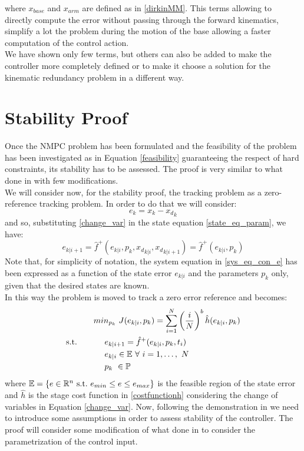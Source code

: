 where $x_{base}$ and $x_{arm}$ are defined as in \ref{dirkinMM}.
This terms allowing to directly compute the error without passing through the forward kinematics, simplify a lot the problem during the motion of the base allowing a faster computation of the control action.\\We have shown only few terms, but others can also be added to make the controller more completely defined or to make it choose a solution for the kinematic redundancy problem in a different way. 

\section{Stability Proof}\label{stabproof}

Once the NMPC problem has been formulated and the feasibility of the problem has been investigated as in Equation \ref{feasibility} guaranteeing the respect of hard  constraints, its stability has to be assessed. The proof is very similar to what done in \cite{alamir2018stability} with few modifications.\\
We will consider now, for the stability proof, the tracking problem as a zero-reference tracking problem. In order to do that we will consider:
\begin{equation}\label{change_var}
    e_k=x_k-{x_d}_k
\end{equation}
and so, substituting \ref{change_var} in the state equation \ref{state_eq_param}, we have:
\begin{equation}\label{sys_eq_con_e}
    e_{k|i+1}=\hat{f}^+(e_{k|i},p_k,{{x_d}_{k|i}},{{x_d}_{k|i+1}})=\hat{f}^+(e_{k|i},p_k)
\end{equation}
Note that, for simplicity of notation, the system equation in \ref{sys_eq_con_e} has been expressed as a function of the state error ${e_{k|i}}$ and the parameters $p_k$ only, given that the desired states are known.\\
In this way the problem is moved to track a zero error reference and becomes: 
\begin{equation} \label{ourproblem_stab}
\begin{split}
		& min_{{p}_k}\ J({e}_{k|i},{p}_k) =\sum_{i=1}^{N}\left(\frac{i}{N}\right)^b\hat{h}(e_{k|i},{p}_{k}) \\
		\textnormal{s.t.}\qquad
		&\ \ \ \ e_{k|i+1}=\hat{f}^+(e_{k|i},p_k,t_i) \\
		&\ \ \ \ e_{k|i} \in \mathbb{E}\ \forall\ i=1,\dots,\ N  \\
		&\ \ \ \ {p}_k\   \in \mathbb{P}\ \\
	\end{split}	
\end{equation}
where $\mathbb{E} = \lbrace {e}\in \mathbb{R}^n\ \textnormal{s.t.}\ {e}_{min}\leq e\leq e_{max} \rbrace$ is the feasible region of the state error and $\hat{h}$ is the stage cost function in \ref{costfunctionh} considering the change of variables in Equation \ref{change_var}. Now, following the demonstration in \cite{alamir2018stability} we need to introduce some assumptions in order to assess stability of the controller. The proof will consider some modification of what done in \cite{alamir2018stability} to consider the parametrization of the control input. 

